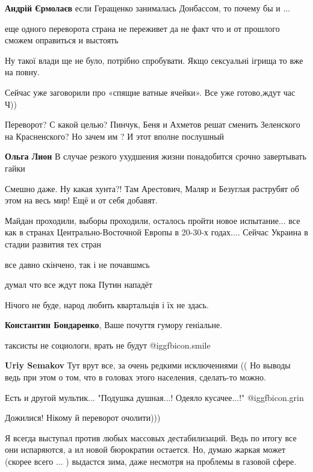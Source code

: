 \begin{itemize}
\begin{itemize}
\textbf{Андрій Єрмолаєв} если Геращенко занималась Донбассом, то почему бы и ...
\end{itemize} %

еще одного переворота страна не переживет да не факт что и от прошлого сможем оправиться и выстоять

Ну такої влади ще не було, потрібно спробувати. Якщо сексуальні ігрища то вже на повну.

Сейчас уже заговорили про «спящие ватные ячейки». Все уже готово,ждут час Ч))

Переворот? С какой целью? Пинчук, Беня и Ахметов решат сменить Зеленского на Красненского? Но зачем им ? И этот вполне послушный

\begin{itemize} %
\textbf{Ольга Лион} В случае резкого ухудшения жизни понадобится срочно завертывать гайки
\end{itemize} %

Смешно даже. Ну какая хунта?! Там Арестович, Маляр и Безуглая раструбят об этом на весь мир! Ещё и от себя добавят.


Майдан проходили, выборы проходили, осталось пройти новое испытание... все как в
странах Центрально-Восточной Европы в 20-30-х годах.... Сейчас Украина в стадии
развития тех стран

все давно скінчено, так і не почавшмсь

думал что все ждут пока Путин нападёт

Нічого не буде, народ любить квартальців і їх не здась.

\textbf{Константин Бондаренко}, Ваше почуття гумору геніальне.

таксисты не социологи, врать не будут  @igg{fbicon.smile} 

\begin{itemize} %
\textbf{Uriy Semakov} Тут врут все, за очень редкими исключениями (( Но выводы ведь при этом о том, что в головах этого населения, сделать-то можно.
\end{itemize} %

Есть и другой мультик...
"Подушка душная...!
Одеяло кусачее...!"
 @igg{fbicon.grin} 

Дожилися! Нікому й переворот очолити)))


Я всегда выступал против любых массовых дестабилизаций. Ведь по итогу все они
испаряются, а ил новой бюрократии остается.  Но, думаю жаркая может (скорее
всего ... ) выдастся зима, даже несмотря на проблемы в газовой сфере.

\end{itemize} %
